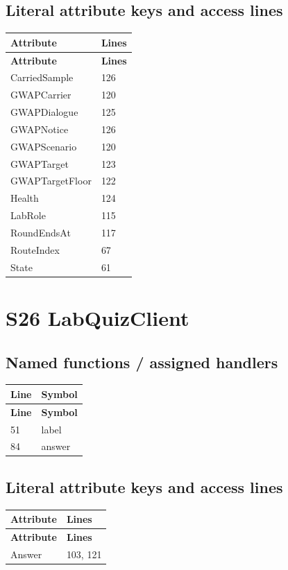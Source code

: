 \subsection{Literal attribute keys and access lines}
\begin{longtable}{p{}p{}}
\toprule
\textbf{Attribute} & \textbf{Lines} \\ \midrule
\endfirsthead
\textbf{Attribute} & \textbf{Lines} \\ \midrule
\endhead
CarriedSample & 126 \\
GWAPCarrier & 120 \\
GWAPDialogue & 125 \\
GWAPNotice & 126 \\
GWAPScenario & 120 \\
GWAPTarget & 123 \\
GWAPTargetFloor & 122 \\
Health & 124 \\
LabRole & 115 \\
RoundEndsAt & 117 \\
RouteIndex & 67 \\
State & 61 \\
\bottomrule
\end{longtable}
\section{S26 LabQuizClient}
\subsection{Named functions /\allowbreak{} assigned handlers}
\begin{longtable}{p{}p{}}
\toprule
\textbf{Line} & \textbf{Symbol} \\ \midrule
\endfirsthead
\textbf{Line} & \textbf{Symbol} \\ \midrule
\endhead
51 & label \\
84 & answer \\
\bottomrule
\end{longtable}
\subsection{Literal attribute keys and access lines}
\begin{longtable}{p{}p{}}
\toprule
\textbf{Attribute} & \textbf{Lines} \\ \midrule
\endfirsthead
\textbf{Attribute} & \textbf{Lines} \\ \midrule
\endhead
Answer & 103, 121 \\
\bottomrule
\end{longtable}

